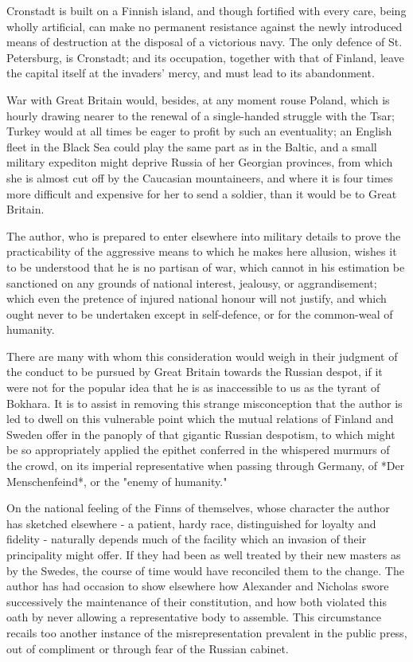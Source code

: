 \documentclass[11pt,a4paper]{article}
\begin{document}
Cronstadt is built on a Finnish island, and though fortified with every care, being wholly artificial, can make no permanent resistance against the newly introduced means of destruction at the disposal of a victorious navy. The only defence of St. Petersburg, is Cronstadt; and its occupation, together with that of Finland, leave the capital itself at the invaders' mercy, and must lead to its abandonment.

War with Great Britain would, besides, at any moment rouse Poland, which is hourly drawing nearer to the renewal of a single-handed struggle with the Tsar; Turkey would at all times be eager to profit by such an eventuality; an English fleet in the Black Sea could play the same part as in the Baltic, and a small military expediton might deprive Russia of her Georgian provinces, from which she is almost cut off by the Caucasian mountaineers, and where it is four times more difficult and expensive for her to send a soldier, than it would be to Great Britain.

The author, who is prepared to enter elsewhere into military details to prove the practicability of the aggressive means to which he makes here allusion, wishes it to be understood that he is no partisan of war, which cannot in his estimation be sanctioned on any grounds of national interest, jealousy, or aggrandisement; which even the pretence of injured national honour will not justify, and which ought never to be undertaken except in self-defence, or for the common-weal of humanity.

There are many with whom this consideration would weigh in their judgment of the conduct to be pursued by Great Britain towards the Russian despot, if it were not for the popular idea that he is as inaccessible to us as the tyrant of Bokhara. It is to assist in removing this strange misconception that the author is led to dwell on this vulnerable point which the mutual relations of Finland and Sweden offer in the panoply of that gigantic Russian despotism, to which might be so appropriately applied the epithet conferred in the whispered murmurs of the crowd, on its imperial representative when passing through Germany, of *Der Menschenfeind*, or the "enemy of humanity."

On the national feeling of the Finns of themselves, whose character the author has sketched elsewhere - a patient, hardy race, distinguished for loyalty and fidelity - naturally depends much of the facility which an invasion of their principality might offer. If they had been as well treated by their new masters as by the Swedes, the course of time would have reconciled them to the change. The author has had occasion to show elsewhere how Alexander and Nicholas swore successively the maintenance of their constitution, and how both violated this oath by never allowing a representative body to assemble. This circumstance recails too another instance of the misrepresentation prevalent in the public press, out of compliment or through fear of the Russian cabinet.
\end{document}

